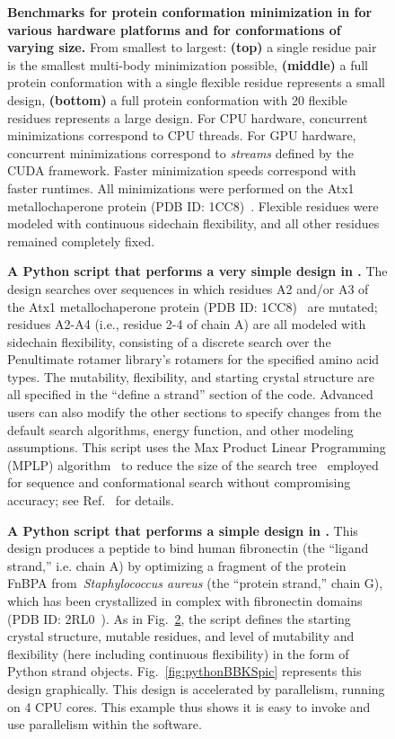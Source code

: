 \begin{figure}
\caption{\textbf{Benchmarks for protein conformation minimization in  for various hardware platforms and for conformations of varying size.} From smallest to largest: {\bf (top)} a single residue pair is the smallest multi-body minimization possible, {\bf (middle)} a full protein conformation with a single flexible residue represents a small design, {\bf (bottom)} a full protein conformation with 20 flexible residues represents a large design. For CPU hardware, concurrent minimizations correspond to CPU threads. For GPU hardware, concurrent minimizations correspond to {\it streams} defined by the CUDA framework. Faster minimization speeds correspond with faster \osprey runtimes. All minimizations were performed on the Atx1 metallochaperone protein (PDB ID: 1CC8)~\cite{1CC8}. Flexible residues were modeled with continuous sidechain flexibility, and all other residues remained completely fixed.}
\label{fig:gpu}
\end{figure}

\begin{figure}
\caption{\textbf{A Python script that performs a very simple design in .}  The design searches over sequences in which residues A2 and/or A3 of the Atx1 metallochaperone protein (PDB ID: 1CC8)~\cite{1CC8} are mutated; residues A2-A4 (i.e., residue 2-4 of chain A) are all modeled with sidechain flexibility, consisting of a discrete search over the Penultimate rotamer library\cite{penultimate}'s rotamers for the specified amino acid types.  The mutability, flexibility, and starting crystal structure are all specified in the ``define a strand'' section of the code.  Advanced users can also modify the other sections to specify changes from the default search algorithms, energy function, and other modeling assumptions.  This script uses the Max Product Linear Programming (MPLP) algorithm~\cite{MPLP} to reduce the size of the \as search tree~\cite{DEE/A*} employed for sequence and conformational search without compromising accuracy; see Ref.~\cite{dynamic_A*} for details.  }
\label{fig:pythonGMEC}
\end{figure}

\begin{figure}
\caption{\textbf{A Python script that performs a simple \bbks design in .}  This design produces a peptide to bind human fibronectin (the ``ligand strand,'' i.e. chain A) by optimizing a fragment of the protein FnBPA from~\textit{Staphylococcus aureus} (the ``protein strand,'' chain G), which has been crystallized in complex with fibronectin domains (PDB ID: 2RL0~\cite{2RL0}).  As in Fig.~\ref{fig:pythonGMEC}, the script defines the starting crystal structure, mutable residues, and level of mutability and flexibility (here including continuous flexibility) in the form of Python strand objects.   Fig.~\ref{fig:pythonBBKSpic} represents this design graphically.  This design is accelerated by parallelism, running on 4 CPU cores.  This example thus shows it is easy to invoke and use parallelism within the  software.  }
\label{fig:pythonBBKS}
\end{figure}

